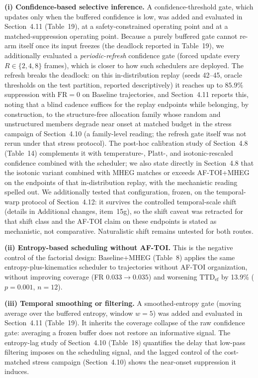 \documentclass[1p,12pt,authoryear]{elsarticle}
\providecommand{\revcolor}{black}%
\begin{document}
\vspace{2mm}
\noindent \textbf{(i) Confidence-based selective inference.} A confidence-threshold gate, which updates only when the buffered confidence is low, was added and evaluated in Section~4.11 (Table~19), at a safety-constrained operating point and at a matched-suppression operating point. Because a purely buffered gate cannot re-arm itself once its input freezes (the deadlock reported in Table~19), we additionally evaluated a \emph{periodic-refresh} confidence gate (forced update every $R \in \{2,4,8\}$ frames), which is closer to how such schedulers are deployed. The refresh breaks the deadlock: on this in-distribution replay (seeds 42--45, oracle thresholds on the test partition, reported descriptively) it reaches up to $85.9\%$ suppression with $\mathrm{FR}=0$ on Baseline trajectories, and Section~4.11 reports this, noting that a blind cadence suffices for the replay endpoints while belonging, by construction, to the structure-free allocation family whose random and unstructured members degrade near onset at matched budget in the stress campaign of Section~4.10 (a family-level reading; the refresh gate itself was not rerun under that stress protocol). The post-hoc calibration study of Section~4.8 (Table~14) complements it with temperature-, Platt-, and isotonic-rescaled confidence combined with the scheduler; we also state directly in Section~4.8 that the isotonic variant combined with MHEG matches or exceeds AF-TOI+MHEG on the endpoints of that in-distribution replay, with the mechanistic reading spelled out. {\color{\revcolor}We additionally tested that configuration, frozen, on the temporal-warp protocol of Section~4.12: it survives the controlled temporal-scale shift (details in Additional changes, item~15g), so the shift caveat was retracted for that shift class and the AF-TOI claim on these endpoints is stated as mechanistic, not comparative. Naturalistic shift remains untested for both routes.}

\vspace{2mm}
\noindent \textbf{(ii) Entropy-based scheduling without AF-TOI.} This is the negative control of the factorial design: Baseline+MHEG (Table~8) applies the same entropy-plus-kinematics scheduler to trajectories without AF-TOI organization, without improving coverage (FR $0.033 \rightarrow 0.035$) and worsening $\mathrm{TTD}_{\mathrm{ef}}$ by 13.9\% ($p=0.001$, $n=12$).

\vspace{2mm}
\noindent \textbf{(iii) Temporal smoothing or filtering.} A smoothed-entropy gate (moving average over the buffered entropy, window $w{=}5$) was added and evaluated in Section~4.11 (Table~19). It inherits the coverage collapse of the raw confidence gate: averaging a frozen buffer does not restore an informative signal. The entropy-lag study of Section~4.10 (Table~18) quantifies the delay that low-pass filtering imposes on the scheduling signal, and the lagged control of the cost-matched stress campaign (Section~4.10) shows the near-onset suppression it induces.
\end{document}
